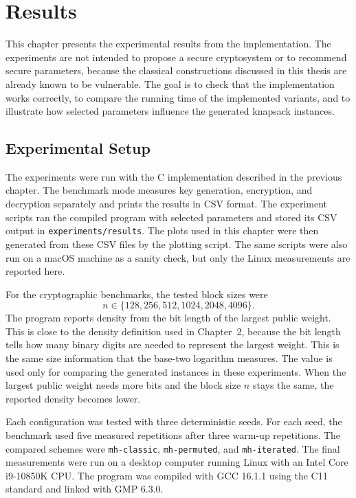 \chapter{Results}

This chapter presents the experimental results from the implementation. The
experiments are not intended to propose a secure cryptosystem or to recommend
secure parameters, because the classical constructions discussed in this thesis
are already known to be vulnerable. The goal is to check that the
implementation works correctly, to compare the running time of the implemented
variants, and to illustrate how selected parameters influence the generated
knapsack instances.

\section{Experimental Setup}

The experiments were run with the C implementation described in the previous
chapter. The benchmark mode measures key generation, encryption, and decryption
separately and prints the results in CSV format. The experiment scripts ran the
compiled program with selected parameters and stored its CSV output in
\texttt{experiments/results}. The plots used in this chapter were then
generated from these CSV files by the plotting script. The same scripts were
also run on a macOS machine as a sanity check, but only the Linux measurements
are reported here.

For the cryptographic benchmarks, the tested block sizes were
\[
    n \in \{128,256,512,1024,2048,4096\}.
\]
The program reports density from the bit length of the largest public weight.
This is close to the density definition used in Chapter~2, because the bit
length tells how many binary digits are needed to represent the largest weight.
This is the same size information that the base-two logarithm measures. The
value is used only for comparing the generated instances in these experiments.
When the largest public weight needs more bits and the block size \(n\) stays
the same, the reported density becomes lower.

Each configuration was tested with three deterministic seeds. For each seed,
the benchmark used five measured repetitions after three warm-up repetitions.
The compared schemes were \texttt{mh-classic}, \texttt{mh-permuted}, and
\texttt{mh-iterated}. The final measurements were run on a desktop computer
running Linux with an Intel Core i9-10850K CPU. The program was compiled with
GCC 16.1.1 using the C11 standard and linked with GMP 6.3.0. 

